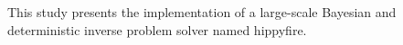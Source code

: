 This study presents the implementation of a large-scale Bayesian and deterministic inverse problem solver named hippyfire.
